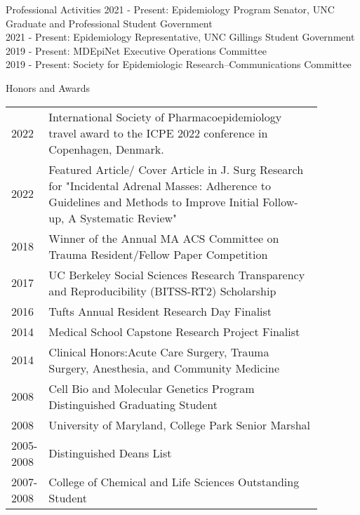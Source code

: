 \documentclass{resume} %
\begin{document}
\begin{rSection}{Professional Activities}
   2021 - Present: Epidemiology Program Senator,  UNC Graduate and Professional Student Government\\ 
   2021 - Present: Epidemiology Representative, UNC Gillings Student Government \\
   2019 - Present: MDEpiNet Executive Operations Committee\\
   2019 - Present: Society for Epidemiologic Research--Communications Committee
   
   \end{rSection}


\begin{rSection}{Honors and Awards}
   \begin{tabular}{lp{0.88\linewidth}}
   2022 & International Society of Pharmacoepidemiology travel award to the ICPE 2022 conference in Copenhagen, Denmark.\\
   2022 & Featured Article/ Cover Article in J. Surg Research for "Incidental Adrenal Masses: Adherence to Guidelines and Methods to Improve Initial Follow-up, A Systematic Review" \\
   2018 & Winner of the Annual MA ACS Committee on Trauma Resident/Fellow Paper Competition\\
   2017 & UC Berkeley Social Sciences Research Transparency and Reproducibility (BITSS-RT2) Scholarship \\
   2016 &Tufts Annual Resident Research Day Finalist\\
   2014 & Medical School Capstone Research Project Finalist \\
   2014 & Clinical Honors:Acute Care Surgery, Trauma Surgery, Anesthesia, and Community Medicine \\
   2008 & Cell Bio and Molecular Genetics Program Distinguished Graduating Student\\
   2008 & University of Maryland, College Park Senior Marshal \\
   2005-2008& Distinguished Deans List \\
   2007-2008 &  College of Chemical and Life Sciences Outstanding Student
\end{tabular}
   \end{rSection}
   
\end{document}
